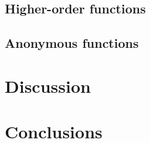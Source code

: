 \documentclass{uva-inf-article}
\begin{document}
\subsection{Higher-order functions}
\subsection{Anonymous functions}

\section{Discussion}

\section{Conclusions}


\printbibliography


\end{document}
